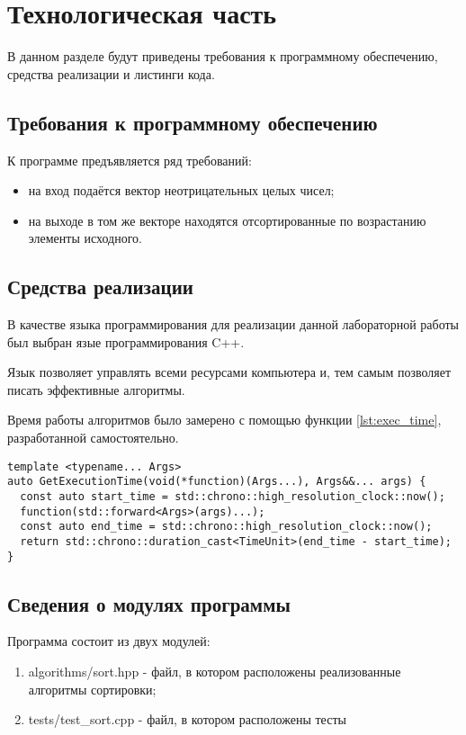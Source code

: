 \chapter{Технологическая часть}

В данном разделе будут приведены требования к программному обеспечению, средства реализации и листинги кода.

\section{Требования к программному обеспечению}

К программе предъявляется ряд требований:
\begin{itemize}
    \item на вход подаётся вектор неотрицательных целых чисел;
    \item на выходе в том же векторе находятся отсортированные по возрастанию элементы исходного.
\end{itemize}

\section{Средства реализации}

В качестве языка программирования для реализации данной лабораторной работы был выбран язые программирования C++\cite{pythonlang}.

Язык позволяет управлять всеми ресурсами компьютера и, тем самым позволяет
писать эффективные алгоритмы.

Время работы алгоритмов было замерено с помощью функции \ref{lst:exec_time}, разработанной самостоятельно.
\begin{lstlisting}[label=lst:exec_time, caption=Функция для замера времени исполнения процедуры]
template <typename... Args>
auto GetExecutionTime(void(*function)(Args...), Args&&... args) {
  const auto start_time = std::chrono::high_resolution_clock::now();
  function(std::forward<Args>(args)...);
  const auto end_time = std::chrono::high_resolution_clock::now();
  return std::chrono::duration_cast<TimeUnit>(end_time - start_time);
}
\end{lstlisting}

\section{Сведения о модулях программы}
Программа состоит из двух модулей:
\begin{enumerate}
    \item algorithms/sort.hpp - файл, в котором расположены реализованные алгоритмы сортировки;
    \item tests/test\_sort.cpp - файл, в котором расположены тесты
\end{enumerate}



